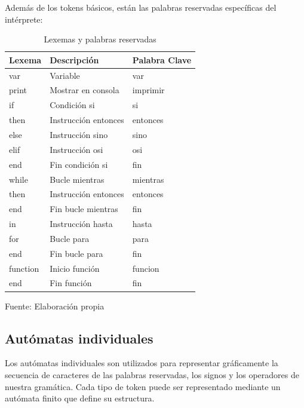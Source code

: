 Además de los tokens básicos, están las palabras reservadas específicas del intérprete:
\begin{table}[!h]
  \begin{center}
    \begin{tabularx}{0.9\textwidth}{|X|X|X|}
      \hline
      \textbf{Lexema} & \textbf{Descripción} & \textbf{Palabra Clave} \\
      \hline
      var & Variable & var \\
      \hline
      print & Mostrar en consola & imprimir \\
      \hline
      if & Condición si & si \\
      \hline
      then & Instrucción entonces & entonces \\
      \hline
      else & Instrucción sino & sino \\
      \hline
      elif & Instrucción osi & osi \\
      \hline
      end & Fin condición si & fin \\
      \hline
      while & Bucle mientras & mientras \\
      \hline
      then & Instrucción entonces & entonces \\
      \hline
      end & Fin bucle mientras & fin \\
      \hline
      in & Instrucción hasta & hasta \\
      \hline
      for & Bucle para & para \\
      \hline
      end & Fin bucle para & fin \\
      \hline
      function & Inicio función & funcion \\
      \hline
      end & Fin función & fin \\
      \hline
    \end{tabularx}
  \end{center}
  \caption{Lexemas y palabras reservadas}
  \centering Fuente: Elaboración propia
  \label{tab:lexemas}
\end{table}

\subsection{Autómatas individuales}
Los autómatas individuales son utilizados para representar gráficamente la secuencia de caracteres de las palabras reservadas, los signos y los operadores de nuestra gramática. Cada tipo de token puede ser representado mediante un autómata finito que define su estructura.

